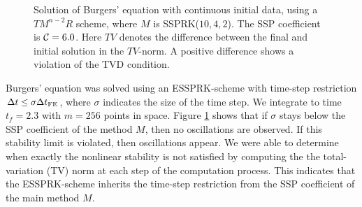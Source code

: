 \begin{figure}[t!]
    \centering
    \caption{Solution of Burgers' equation with continuous initial data, using a 
    $TM^{n-2}R$ scheme, where $ M $ is SSPRK($10,4,2$). 
    The SSP coefficient is $\mathcal{C} = 6.0$. 
    Here $TV$ denotes the difference between the final and initial solution in 
    the $TV$-norm. 
    A positive difference shows a violation of the TVD condition.}
    \label{fig:burgers_cont}
\end{figure}

Burgers' equation was solved using an ESSPRK-scheme with time-step 
restriction $\Delta t \leq \sigma{\Delta t}_{\text{FE}}$, where $\sigma$ indicates the size 
of the time step. 
We integrate to time $t_{f} = 2.3$
with $m = 256$ points in space.
Figure \ref{fig:burgers_cont} shows that if $\sigma$ stays below the SSP 
coefficient of the method $M$, then no oscillations are observed. 
If this stability limit is violated, then oscillations appear. 
We were able to determine when exactly the nonlinear stability is not 
satisfied by computing the the total-variation (TV) norm at each step of the 
computation process. 
This indicates that the ESSPRK-scheme inherits the time-step restriction 
from the SSP coefficient of the main method $M$.


